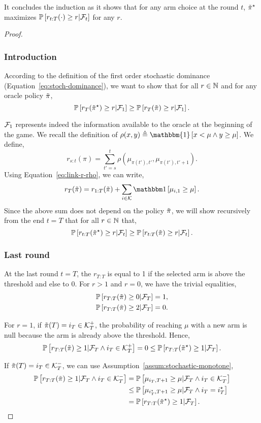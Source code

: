 It concludes the induction as it shows that for any arm choice at the round $t$, $\Tilde{\pi}^\star$ maximizes $\mathbb{P}\left[r_{t:T}(\cdot) \geq r| \mathcal{F}_t\right]$ for any $r$. 
\begin{proof}
\subsubsection{Introduction}
According to the definition of the first order stochastic dominance (Equation~\ref{eq:stoch-dominance}), we want to show that for all $r\in {\mathbb N}$ and for any oracle policy $\Tilde{\pi}$, 
\[
\mathbb{P}\left[r_T(\Tilde{\pi}^\star) \geq r| \mathcal{F}_1\right] \geq \mathbb{P}\left[r_T(\Tilde{\pi}) \geq r|\mathcal{F}_1\right].
\]

$\mathcal{F}_1$ represents indeed the information available to the oracle at the beginning of the game. We recall the definition of $\rho(x, y) \triangleq \mathbbm{1}\left[x<\mu \land y \geq \mu\right]$. We define,
\[
r_{s:t}(\pi) =  \sum_{t'=s}^t \rho(\mu_{\pi(t'), t'},\mu_{\pi(t'), t'+1}). 
\]
Using Equation~\ref{eq:link-r-rho}, we can write, 
\[
r_T(\Tpi) =  r_{1:T}(\Tpi) + \sum_{i \in \arms} \ind{ \mu_{i,1} \geq \mu}.
\]
Since the above sum does not depend on the policy $\Tilde{\pi}$, we will show recursively from the end $t=T$ that for all $r\in {\mathbb N}$ that, 
\[
\mathbb{P}\left[r_{t:T}(\Tilde{\pi}^\star) \geq r| \mathcal{F}_t\right] \geq \mathbb{P}\left[r_{t:T}(\Tilde{\pi}) \geq r| \mathcal{F}_t\right].
\]

\subsubsection{Last round}
At the last round $t=T$, the $r_{T:T}$ is equal to 1 if the selected arm is above the threshold and else to 0. For $r > 1$ and $r=0$, we have the trivial equalities,
\begin{align*}
    &\mathbb{P}\left[r_{T:T}(\Tilde{\pi}) \geq 0| \mathcal{F}_T\right] = 1,\\
    &\mathbb{P}\left[r_{T:T}(\Tilde{\pi}) \geq 2| \mathcal{F}_T\right] = 0.
\end{align*}

For $r=1$, if $\Tilde{\pi}(T) = i_T \in \mathcal{K}_T^+$, the probability of reaching $\mu$ with a new arm is null because the arm is already above the threshold. Hence, 
\[\mathbb{P}\left[r_{T:T}(\Tilde{\pi}) \geq 1| \mathcal{F}_T \land i_T \in \mathcal{K}_T^+\right] = 0 \leq \mathbb{P}\left[r_{T:T}(\Tilde{\pi}^\star) \geq 1| \mathcal{F}_T\right].\]

If $\Tilde{\pi}(T) = i_T \in \mathcal{K}_T^-$, we can use Assumption~\ref{assum:stochastic-monotone},
\begin{align*}
    \mathbb{P}\left[r_{T:T}(\Tilde{\pi}) \geq 1| \mathcal{F}_T \land i_T \in \mathcal{K}_T^-\right] &= \mathbb{P}\left[\mu_{i_T,T+1}\geq \mu |\mathcal{F}_T \land i_T \in \mathcal{K}_T^-\right] \\
    &\leq \mathbb{P}\left[\mu_{i^\star_T,T+1}\geq \mu |  \mathcal{F}_T \land i_T = i^\star_T\right]\\
    &= \mathbb{P}\left[r_{T:T}(\Tilde{\pi}^\star) \geq 1| \mathcal{F}_T\right].
\end{align*}


\end{proof}
